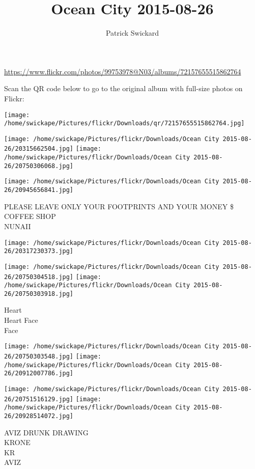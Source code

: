 \documentclass[10pt,letterpaper]{article}
\title{Ocean City 2015-08-26}
\author{Patrick Swickard}
\date{}
\begin{document}
\maketitle

\url{https://www.flickr.com/photos/99753978@N03/albums/72157655515862764}

Scan the QR code below to go to the original album with full-size photos on Flickr:

\texttt{[image: /home/swickape/Pictures/flickr/Downloads/qr/72157655515862764.jpg]}
\pagebreak

\texttt{[image: /home/swickape/Pictures/flickr/Downloads/Ocean City 2015-08-26/20315662504.jpg]}
\texttt{[image: /home/swickape/Pictures/flickr/Downloads/Ocean City 2015-08-26/20750306068.jpg]}

\texttt{[image: /home/swickape/Pictures/flickr/Downloads/Ocean City 2015-08-26/20945656841.jpg]}

PLEASE LEAVE ONLY YOUR FOOTPRINTS AND YOUR MONEY \$\\
COFFEE SHOP\\
NUNAII
\pagebreak

\texttt{[image: /home/swickape/Pictures/flickr/Downloads/Ocean City 2015-08-26/20317230373.jpg]}

\vspace{0.25in}
\texttt{[image: /home/swickape/Pictures/flickr/Downloads/Ocean City 2015-08-26/20750304518.jpg]}
\texttt{[image: /home/swickape/Pictures/flickr/Downloads/Ocean City 2015-08-26/20750303918.jpg]}

Heart\\
Heart Face\\
Face
\pagebreak

\texttt{[image: /home/swickape/Pictures/flickr/Downloads/Ocean City 2015-08-26/20750303548.jpg]}
\texttt{[image: /home/swickape/Pictures/flickr/Downloads/Ocean City 2015-08-26/20912007786.jpg]}

\texttt{[image: /home/swickape/Pictures/flickr/Downloads/Ocean City 2015-08-26/20751516129.jpg]}
\texttt{[image: /home/swickape/Pictures/flickr/Downloads/Ocean City 2015-08-26/20928514072.jpg]}

AVIZ DRUNK DRAWING\\
KRONE\\
KR\\
AVIZ
\pagebreak
\end{document}
